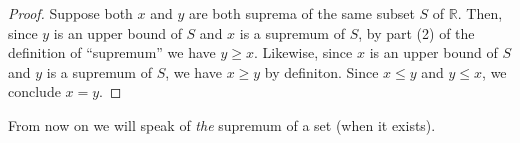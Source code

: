 \documentclass[12pt]{amsart}
\def\e{\varepsilon}
\newcommand{\R}{{\mathbb{R}}}
\numberwithin{equation}{section}
\theoremstyle{plain} %
\newtheorem{prop}[equation]{Proposition}
\theoremstyle{definition}
\theoremstyle{remark}
\begin{document}
\begin{proof} Suppose both $x$ and $y$ are both suprema 
  of the same subset $S$ of $\R$.  Then, since $y$ is an upper bound of $S$ and $x$ is a supremum of $S$, by part (2) of the definition of ``supremum''
  we have $y \geq x$. Likewise, since $x$ is an upper
bound of $S$ and $y$ is a supremum of $S$, we have 
$x \geq y$ by definiton.  Since $x \leq y$ and $y \leq x$, we conclude $x = y$.  
\end{proof}


From now on we will speak of {\em the} supremum of a set (when  it exists).

\begin{comment}

\section{Monday, February 8}



Let us now explore consequences of the completeness axiom. First up, we show that it implies that $\sqrt{2}$ really exists:


\begin{prop} \label{prop116} There is a positive real number whose square is $2$. 
\end{prop}

\begin{proof} 
Define $S$ to be the subset 
$$
S = \{x \in \R \mid x^2 < 2\}.
$$
$S$ is nonempty since, for example, $1 \in S$, and it is bounded above, since, for example, 
$2$ is an upper bound for $S$, as we showed earlier.  So, by the Completeness Axiom, $S$ has a least upper bound, and we know it is unique from
  the proposition above. Let us call it $\ell$. I will prove $\ell^2 = 2$. 

We know one of $\ell^2 > 2$, $\ell^2 < 2$ or $\ell^2 = 2$ must hold. We prove $\ell^2 = 2$ by showing that both
$\ell^2 > 2$ and $\ell^2 < 2$ are impossible.

We start by observing that $1 \leq \ell \leq 2$. The inequality $1 \leq \ell$ holds since $1 \in S$ and $\ell$ is an upper bound of $S$, 
and the inequality $\ell \leq 2$ holds  since $2$ is an upper bound of $S$ and $\ell$ is the least upper bound of~$S$.


Suppose $\ell^2 < 2$. We show this leads to a contradiction by showing that $\ell$ is not an upper bound of $S$ in this case. We will do this by constructing a number
that is ever so slightly bigger than $\ell$ and  belongs to $S$. 
Let $\e = 2 - \ell^2$. Then $0 < \e \leq 1$ (since $\ell^2 < 2$ and $\ell^2 \geq 1$).  
We will now show that $\ell + \e/5$ is in $S$: We have
$$
(\ell + \e/5)^2 = \ell^2 + \frac25 \ell\e + \frac{\e^2}{25} = \ell^2 + \e(\frac{2\ell}{5} + \frac{\e}{25}).
$$
Now, using $\ell \leq 2$ and $0 < \e \leq 1$, we deduce
$$
0 < \frac{2\ell}{5} + \frac{\e}{25} \leq \frac45 + \frac{\e}{25} < 1.
$$
Putting these equations and inequalities  together yields
$$
(\ell + \frac{\e}{5})^2 < \ell^2 + \e = 2.
$$
So, $\ell + \frac{\e}{5} \in S$ and yet $\ell + \frac{\e}{5} > \ell$, contradicting the fact that $l$ is an upper bound of $S$. We conclude $\ell^2 < 2$ is not
possible.


\end{comment}
\end{document}
